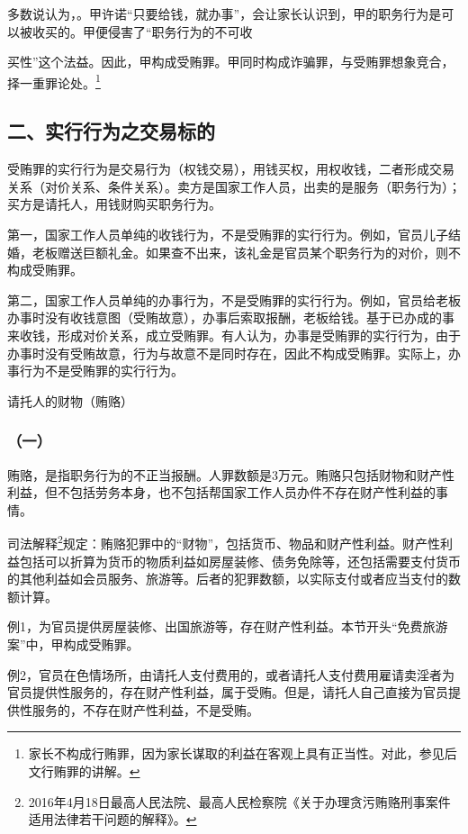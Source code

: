 多数说认为，。甲许诺“只要给钱，就办事”，会让家长认识到，甲的职务行为是可以被收买的。甲便侵害了“职务行为的不可收

买性”这个法益。因此，甲构成受贿罪。甲同时构成诈骗罪，与受贿罪想象竞合，择一重罪论处。\footnote{家长不构成行贿罪，因为家长谋取的利益在客观上具有正当性。对此，参见后文行贿罪的讲解。}

\subsection*{二、实行行为之交易标的}

受贿罪的实行行为是交易行为（权钱交易），用钱买权，用权收钱，二者形成交易关系（对价关系、条件关系）。卖方是国家工作人员，出卖的是服务（职务行为）；买方是请托人，用钱财购买职务行为。

第一，国家工作人员单纯的收钱行为，不是受贿罪的实行行为。例如，官员儿子结婚，老板赠送巨额礼金。如果查不出来，该礼金是官员某个职务行为的对价，则不构成受贿罪。

第二，国家工作人员单纯的办事行为，不是受贿罪的实行行为。例如，官员给老板办事时没有收钱意图（受贿故意），办事后索取报酬，老板给钱。基于已办成的事来收钱，形成对价关系，成立受贿罪。有人认为，办事是受贿罪的实行行为，由于办事时没有受贿故意，行为与故意不是同时存在，因此不构成受贿罪。实际上，办事行为不是受贿罪的实行行为。


请托人的财物（贿赂）

\subsubsection*{（一）}

贿赂，是指职务行为的不正当报酬。人罪数额是3万元。贿赂只包括财物和财产性利益，但不包括劳务本身，也不包括帮国家工作人员办件不存在财产性利益的事情。

司法解释\footnote{2016年4月18日最高人民法院、最高人民检察院《关于办理贪污贿赂刑事案件适用法律若干问题的解释》。}规定：贿赂犯罪中的“财物”，包括货币、物品和财产性利益。财产性利益包括可以折算为货币的物质利益如房屋装修、债务免除等，还包括需要支付货币的其他利益如会员服务、旅游等。后者的犯罪数额，以实际支付或者应当支付的数额计算。

例1，为官员提供房屋装修、出国旅游等，存在财产性利益。本节开头“免费旅游案”中，甲构成受贿罪。

例2，官员在色情场所，由请托人支付费用的，或者请托人支付费用雇请卖淫者为官员提供性服务的，存在财产性利益，属于受贿。但是，请托人自己直接为官员提供性服务的，不存在财产性利益，不是受贿。

